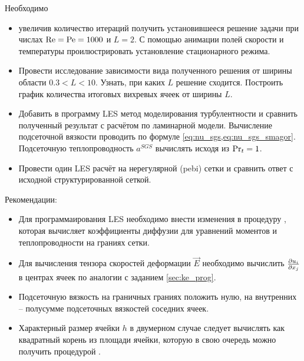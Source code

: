 Необходимо
\begin{itemize}
\item увеличив количество итераций получить установившееся решение задачи при числах $\mathrm{Re}=\mathrm{Pe}=1000$ и $L=2$.
      С помощью анимации полей скорости и температуры проилюстрировать установление стационарного режима.
\item Провести исследование зависимости вида полученного решения от ширины области $0.3 < L < 10$.
      Узнать, при каких $L$ решение сходится. Построить график количества итоговых вихревых ячеек от ширины $L$.
\item Добавить в программу LES метод моделирования турбулентности и сравнить полученный результат с расчётом по ламинарной модели.
      Вычисление подсеточной вязкости проводить по формуле \cref{eq:nu_sgs,eq:nu_sgs_smagor}.
      Подсеточную теплопроводность $a^{SGS}$ вычислять исходя из ${\rm Pr}_t = 1$.
\item Провести один LES расчёт на нерегулярной (pebi) сетки и сравнить ответ с исходной структурированной сеткой.
\end{itemize}

Рекомендации:
\begin{itemize}
\item Для программаирования LES необходимо внести изменения в процедуру , которая вычисляет
      коэффициенты диффузии для уравнений моментов и теплопроводности на граниях сетки.
\item Для вычисления тензора скоростей деформации $\vec E$ необходимо вычислить $\frac{\partial u_i}{\partial x_j}$ в центрах ячеек по аналогии с заданием \ref{sec:ke_prog}.
\item Подсеточную вязкость на граничных граниях положить нулю, на внутренних -- полусумме подсеточных вязкостей соседних ячеек.
\item Характерный размер ячейки $h$ в двумерном случае следует вычислять как квадратный корень из площади ячейки,
      которую в свою очередь можно получить процедурой .
\end{itemize}
